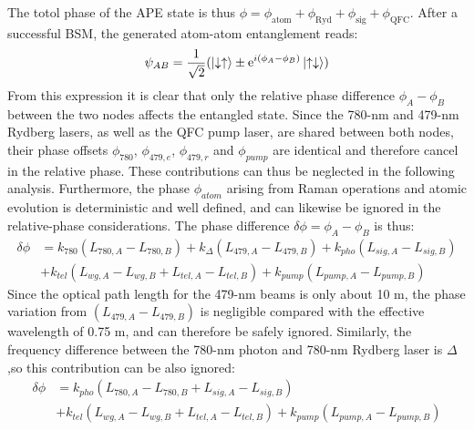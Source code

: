 \documentclass[aps,reprint,showpacs,superscriptaddress]{revtex4-2}
\begin{document}
The totol phase of the APE state is thus $\phi = \phi_{\text{atom}} + \phi_{\text{Ryd}} + \phi_{\text{sig}} + \phi_{\text{QFC}}$. After a successful BSM, the generated atom-atom entanglement reads:
\begin{equation}
	\psi_{AB} = \frac{1}{\sqrt{2}}(\ket{\downarrow\uparrow}\pm\text{e}^{i(\phi_{A}-\phi_{B})}\ket{\uparrow\downarrow})
\end{equation}
From this expression it is clear that only the relative phase difference $\phi_{A}-\phi_{B}$ between the two nodes affects the entangled state. Since the 780-nm and 479-nm Rydberg lasers, as well as the QFC pump laser, are shared between both nodes, their phase offsets $\phi_{780}$, $\phi_{479,e}$, $\phi_{479,r}$ and $\phi_{pump}$ are identical and therefore cancel in the relative phase. These contributions can thus be neglected in the following analysis. Furthermore, the phase $\phi_{atom}$ arising from Raman operations and atomic evolution is deterministic and well defined, and can likewise be ignored in the relative-phase considerations. The phase difference $\delta\phi = \phi_{A}-\phi_{B}$ is thus:
\begin{equation}
	\begin{aligned}
		\delta\phi &= k_{780}(L_{780,A}-L_{780,B}) + k_{\Delta}(L_{479,A}-L_{479,B}) + k_{pho}(L_{sig,A}-L_{sig,B})\\
		&+k_{tel}(L_{wg,A}-L_{wg,B}+L_{tel,A}-L_{tel,B})+k_{pump}(L_{pump,A}-L_{pump,B})
	\end{aligned}
\end{equation}
Since the optical path length for the 479-nm beams is only about 10 m, the phase variation from $(L_{479,A}-L_{479,B})$ is negligible compared with the effective wavelength of 0.75 m, and can therefore be safely ignored. Similarly, the frequency difference between the 780-nm photon and 780-nm Rydberg laser is $\Delta$,so this contribution can be also ignored:
\begin{equation}
	\begin{aligned}
		\delta\phi &= k_{pho}(L_{780,A}-L_{780,B}+L_{sig,A}-L_{sig,B})\\&+k_{tel}(L_{wg,A}-L_{wg,B}+L_{tel,A}-L_{tel,B})+k_{pump}(L_{pump,A}-L_{pump,B})
	\end{aligned}
\end{equation}
\end{document}
